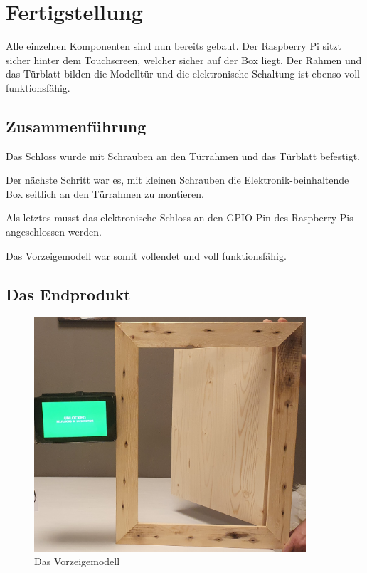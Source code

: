 \chapter{Fertigstellung}
Alle einzelnen Komponenten sind nun bereits gebaut. Der Raspberry Pi sitzt sicher hinter
dem Touchscreen, welcher sicher auf der Box liegt. Der Rahmen und das Türblatt bilden die
Modelltür und die elektronische Schaltung ist ebenso voll funktionsfähig.

\section{Zusammenführung}

Das Schloss wurde mit Schrauben an den Türrahmen und das Türblatt befestigt.

Der nächste Schritt war es, mit kleinen Schrauben die Elektronik-beinhaltende Box
seitlich an den Türrahmen zu montieren.

Als letztes musst das elektronische Schloss an den GPIO-Pin des Raspberry Pis angeschlossen werden.

Das Vorzeigemodell war somit vollendet und voll funktionsfähig.

\section{Das Endprodukt}
\begin{figure}[H]
    \begin{center}
        \includegraphics[width=0.9\textwidth]{images/core/fertig.jpg}
        \caption{Das Vorzeigemodell}
    \end{center}
\end{figure}